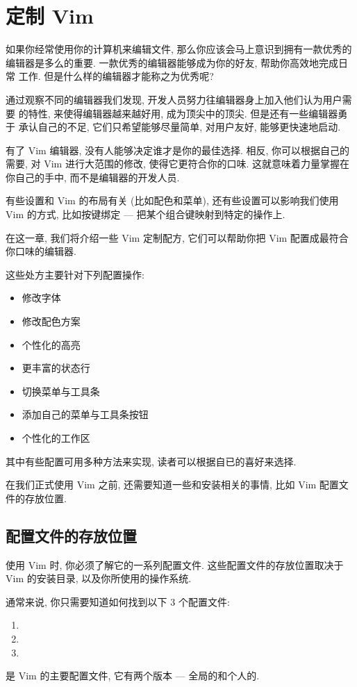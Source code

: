 \chapter{定制 Vim}
\label{chap:personalizing_vim}
如果你经常使用你的计算机来编辑文件, 那么你应该会马上意识到拥有一款优秀的
编辑器是多么的重要. 一款优秀的编辑器能够成为你的好友, 帮助你高效地完成日常
工作. 但是什么样的编辑器才能称之为优秀呢?

通过观察不同的编辑器我们发现, 开发人员努力往编辑器身上加入他们认为用户需要
的特性, 来使得编辑器越来越好用, 成为顶尖中的顶尖.  但是还有一些编辑器勇于
承认自己的不足, 它们只希望能够尽量简单, 对用户友好, 能够更快速地启动.

有了 Vim 编辑器, 没有人能够决定谁才是你的最佳选择. 相反, 你可以根据自己的
需要, 对 Vim 进行大范围的修改, 使得它更符合你的口味. 这就意味着力量掌握在
你自己的手中, 而不是编辑器的开发人员.

有些设置和 Vim 的布局有关 (比如配色和菜单), 还有些设置可以影响我们使用
Vim 的方式, 比如按键绑定 --- 把某个组合键映射到特定的操作上.

在这一章, 我们将介绍一些 Vim 定制配方, 它们可以帮助你把 Vim 配置成最符合
你口味的编辑器.

这些处方主要针对下列配置操作:
\begin{itemize}
    \item 修改字体
    \item 修改配色方案
    \item 个性化的高亮
    \item 更丰富的状态行
    \item 切换菜单与工具条
    \item 添加自己的菜单与工具条按钮
    \item 个性化的工作区
\end{itemize}
其中有些配置可用多种方法来实现, 读者可以根据自已的喜好来选择.

在我们正式使用 Vim 之前, 还需要知道一些和安装相关的事情, 比如 Vim
配置文件的存放位置.

\section{配置文件的存放位置}
\label{sec:where_the_configuration_files}
使用 Vim 时, 你必须了解它的一系列配置文件. 这些配置文件的存放位置取决于
Vim 的安装目录, 以及你所使用的操作系统.

通常来说, 你只需要知道如何找到以下 3 个配置文件:
\begin{enumerate}
    \item {}
    \item {}
    \item {}
\end{enumerate}
 是 Vim 的主要配置文件, 它有两个版本 --- 全局的和个人的.

